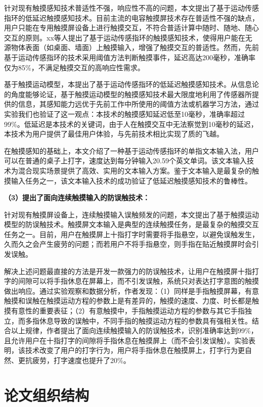 针对现有触摸感知技术普适性不强，响应性不高的问题，本文提出了基于运动传感指环的低延迟触摸感知技术。目前主流的电容触摸屏技术存在普适性不强的缺点，用户只能在专用触摸屏设备上进行触摸交互，不符合普适计算中随时、随地、随心交互的原则。xx等人提出了基于运动传感指环的触摸感知技术，使得用户能在无源物体表面（如桌面、墙面）上触摸输入，增强了触摸交互的普适性。然而，先前基于运动传感指环的技术采用阈值方法判断触摸事件，延迟高达200毫秒，准确率仅为85\%，不满足触摸交互的高响应性需求。

基于触摸运动模型，本提出了基于运动传感指环的低延迟触摸感知技术。从信息论的角度能够论证，基于触摸运动模型的触摸感知技术最大限度地利用了传感器所提供的信息，其感知能力远优于先前工作中所使用的阈值方法或机器学习方法，通过实验我们也验证了这一观点：本技术的触摸感知延迟低至10毫秒，准确率超过99\%。低延迟是本技术的关键词，由于人在触摸交互中无法察觉到10毫秒的延迟，本技术为用户提供了最佳用户体验，与先前技术相比实现了质的飞越。

在触摸感知的基础上，本文介绍了一种基于运动传感指环的单指文本输入法，用户可以在普通的桌子上打字，速度达到每分钟输入20.59个英文单词。该文本输入技术为混合现实场景提供了高效、实用的文本输入方案。鉴于文本输入是最复杂的触摸输入任务之一，该文本输入技术的成功验证了低延迟触摸感知技术的鲁棒性。

\textbf{（3）提出了面向连续触摸输入的防误触技术：}

针对现有触摸屏设备上，连续触摸输入误触频发的问题，本文提出了基于触摸运动模型的防误触技术。触摸屏文本输入是典型的连续触摸任务，是最复杂的触摸交互任务之一。目前，用户在触摸屏上十指打字时需要将手指悬空，以避免误触发生，久而久之会产生疲劳的问题；而若用户不将手指悬空，则手指在贴近触摸屏时会引发误触。

解决上述问题最直接的方法是开发一款强力的防误触技术，让用户在触摸屏十指打字的间隙可以将手指休息在屏幕上，而不引发误触，系统只对表达打字意图的触摸做出响应。通过实验观察和数据分析，作者发现：（1）同样是手指触摸屏幕，有意触摸和误触在触摸运动方程的参数上是有差异的，触摸的速度、力度、时长都是触摸有意性的重要表征；（2）有意触摸中，手指触摸运动方程的参数与其它手指独立，而多指休息导致的误触中，不同手指的触摸运动方程的参数具有强相关性。结合以上规律，作者提出了面向连续触摸输入的防误触技术，识别准确率达到99\%，且允许用户在十指打字的间隙将手指休息在触摸屏上（而不会引发误触）。实验表明，该技术改变了用户的打字行为，用户将手指休息在触摸屏上，打字行为更自然、更抗疲劳，打字速度也提升了20\%。

\section{论文组织结构}

